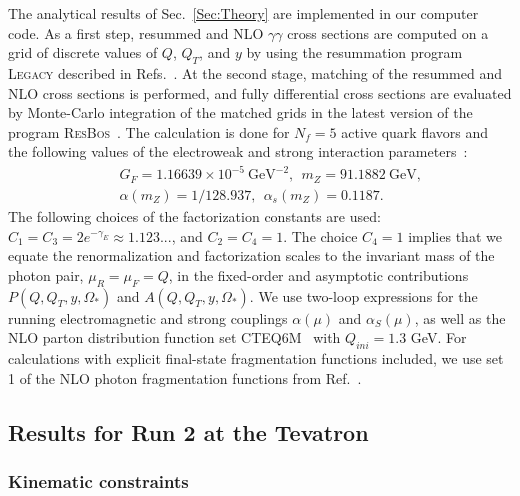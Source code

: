\documentclass[12pt,english,aps,preprint,prd,letterpaper,fleqn,nofootinbib,showpacs,showkeys,tightenlines,floatfix]{revtex4}
\begin{document}
The analytical results of Sec.~\ref{Sec:Theory} are implemented
in our computer code. As a first step, resummed and NLO $\gamma\gamma$
cross sections are computed on a grid of discrete values of $Q$,
$Q_{T}$, and $y$ by using the resummation program \textsc{Legacy}
described in Refs.~\cite{Ladinsky:1993zn,Landry:2002ix}. At the
second stage, matching of the resummed and NLO cross sections is performed,
and fully differential cross sections are evaluated by Monte-Carlo
integration of the matched grids in the latest version of the program
\textsc{ResBos}~\cite{Balazs:1997xd,Balazs:1999gh}. The calculation
is done for $N_{f}=5$ active quark flavors and the following values
of the electroweak and strong interaction parameters~\cite{Eidelman:2004wy}:
\begin{eqnarray}
 &  & G_{F}=1.16639\times10^{-5}~\textrm{GeV}^{-2},~~m_{Z}=91.1882~{\textrm{GeV}},\\
 &  & \alpha(m_{Z})=1/128.937,~~\alpha_{s}(m_{Z})=0.1187.\end{eqnarray}
 The following choices of the factorization constants are used: $C_{1}=C_{3}=2e^{-\gamma_{E}}\approx1.123...$,
and $C_{2}=C_{4}=1.$ The choice $C_{4}=1$ implies that we equate
the renormalization and factorization scales to the invariant mass
of the photon pair, $\mu_{R}=\mu_{F}=Q$, in the fixed-order and asymptotic
contributions $P(Q,Q_{T},y,\Omega_{*})$ and $A(Q,Q_{T},y,\Omega_{*})$.
We use two-loop expressions for the running electromagnetic and strong
couplings $\alpha(\mu)$ and $\alpha_{S}(\mu)$, as well as the NLO
parton distribution function set CTEQ6M~\cite{Pumplin:2002vw} with
$Q_{ini}=1.3$ GeV. For calculations with explicit final-state fragmentation
functions included, we use set 1 of the NLO photon fragmentation functions
from Ref.~\cite{Bourhis:1997yu}.


\subsection{Results for Run 2 at the Tevatron}


\subsubsection{Kinematic constraints \label{subsection:KinematicsTev}}
\end{document}
